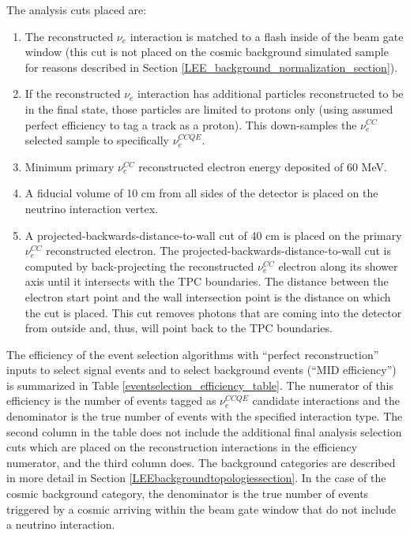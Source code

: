 The analysis cuts placed are:
\begin{enumerate}
\item The reconstructed $\nu_e$ interaction is matched to a flash inside of the beam gate window (this cut is not placed on the cosmic background simulated sample for reasons described in Section \ref{LEE_background_normalization_section}).
\item If the reconstructed $\nu_e$ interaction has additional particles reconstructed to be in the final state, those particles are limited to protons only (using assumed perfect efficiency to tag a track as a proton). This down-samples the $\nu_e^{CC}$ selected sample to specifically $\nu_e^{CCQE}$.
\item Minimum primary $\nu_e^{CC}$ reconstructed electron energy deposited of 60 MeV.
\item A fiducial volume of 10 cm from all sides of the detector is placed on the neutrino interaction vertex.
\item A projected-backwards-distance-to-wall cut of 40 cm is placed on the primary $\nu_e^{CC}$ reconstructed electron. The projected-backwards-distance-to-wall cut is computed by back-projecting the reconstructed $\nu_e^{CC}$ electron along its shower axis until it intersects with the TPC boundaries. The distance between the electron start point and the wall intersection point is the distance on which the cut is placed. This cut removes photons that are coming into the detector from outside and, thus, will point back to the TPC boundaries.
\end{enumerate}



The efficiency of the event selection algorithms with ``perfect reconstruction'' inputs to select signal events and to select background events (``MID efficiency'') is summarized in Table \ref{eventselection_efficiency_table}. The numerator of this efficiency is the number of events tagged as $\nu_e^{CCQE}$ candidate interactions and the denominator is the true number of events with the specified interaction type. The second column in the table does not include the additional final analysis selection cuts which are placed on the reconstruction interactions in the efficiency numerator, and the third column does. The background categories are described in more detail in Section \ref{LEEbackgroundtopologiessection}. In the case of the cosmic background category, the denominator is the true number of events triggered by a cosmic arriving within the beam gate window that do not include a neutrino interaction.\\


